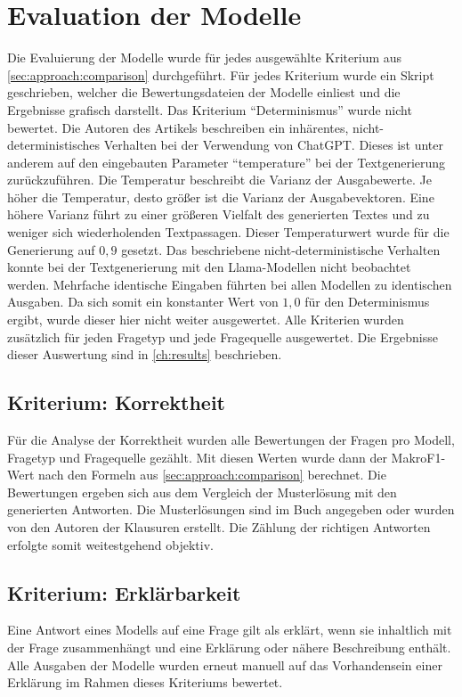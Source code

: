 \section{Evaluation der Modelle}\label{sec:evaluation}
Die Evaluierung der Modelle wurde für jedes ausgewählte Kriterium aus \cref{sec:approach:comparison} durchgeführt.
Für jedes Kriterium wurde ein Skript geschrieben, welcher die Bewertungsdateien der Modelle einliest und die Ergebnisse grafisch darstellt.
Das Kriterium \enquote{Determinismus} wurde nicht bewertet.
Die Autoren des Artikels \citet{chatgpt_qas} beschreiben ein inhärentes, nicht-deterministisches Verhalten bei der Verwendung von ChatGPT.
Dieses ist unter anderem auf den eingebauten Parameter \enquote{temperature} bei der Textgenerierung zurückzuführen.
Die Temperatur beschreibt die Varianz der Ausgabewerte.
Je höher die Temperatur, desto größer ist die Varianz der Ausgabevektoren.
Eine höhere Varianz führt zu einer größeren Vielfalt des generierten Textes und zu weniger sich wiederholenden Textpassagen.
Dieser Temperaturwert wurde für die Generierung auf $0,9$ gesetzt.
Das beschriebene nicht-deterministische Verhalten konnte bei der Textgenerierung mit den Llama-Modellen nicht beobachtet werden.
Mehrfache identische Eingaben führten bei allen Modellen zu identischen Ausgaben.
Da sich somit ein konstanter Wert von $1,0$ für den Determinismus ergibt, wurde dieser hier nicht weiter ausgewertet.
Alle Kriterien wurden zusätzlich für jeden Fragetyp und jede Fragequelle ausgewertet.
Die Ergebnisse dieser Auswertung sind in \cref{ch:results} beschrieben.\\

\subsection{Kriterium: Korrektheit}
Für die Analyse der Korrektheit wurden alle Bewertungen der Fragen pro Modell, Fragetyp und Fragequelle gezählt.
Mit diesen Werten wurde dann der MakroF1-Wert nach den Formeln aus \cref{sec:approach:comparison} berechnet.
Die Bewertungen ergeben sich aus dem Vergleich der Musterlösung mit den generierten Antworten.
Die Musterlösungen sind im Buch angegeben oder wurden von den Autoren der Klausuren erstellt.
Die Zählung der richtigen Antworten erfolgte somit weitestgehend objektiv.

\subsection{Kriterium: Erklärbarkeit}
Eine Antwort eines Modells auf eine Frage gilt als erklärt, wenn sie inhaltlich mit der Frage zusammenhängt und eine Erklärung oder nähere Beschreibung enthält.
Alle Ausgaben der Modelle wurden erneut manuell auf das Vorhandensein einer Erklärung im Rahmen dieses Kriteriums bewertet.

